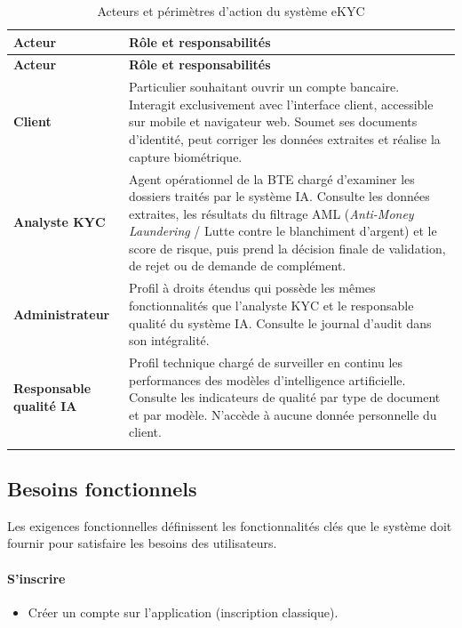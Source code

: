 \renewcommand{\arraystretch}{1.5}
\begin{longtable}{|>{\bfseries}p{3.8cm}|p{10.2cm}|}
  \hline
  \rowcolor{bleu_clair!20}
  \textbf{Acteur} & \textbf{Rôle et responsabilités} \\
  \hline
  \endfirsthead
  \hline
  \rowcolor{bleu_clair!20}
  \textbf{Acteur} & \textbf{Rôle et responsabilités} \\
  \hline
  \endhead
    Client & 
      Particulier souhaitant ouvrir un compte bancaire. Interagit exclusivement avec l'interface client, accessible sur mobile et navigateur web. Soumet ses documents d'identité, peut corriger les données extraites et réalise la capture biométrique. \\
    \hline
    Analyste KYC & 
      Agent opérationnel de la BTE chargé d'examiner les dossiers traités par le système IA. Consulte les données extraites, les résultats du filtrage AML (\textit{Anti-Money Laundering} / Lutte contre le blanchiment d'argent) et le score de risque, puis prend la décision finale de validation, de rejet ou de demande de complément. \\
    \hline
    Administrateur & 
      Profil à droits étendus qui possède les mêmes fonctionnalités que l'analyste KYC et le responsable qualité du système IA. Consulte le journal d'audit dans son intégralité. \\
    \hline
    Responsable qualité IA & 
      Profil technique chargé de surveiller en continu les performances des modèles d'intelligence artificielle. Consulte les indicateurs de qualité par type de document et par modèle. N'accède à aucune donnée personnelle du client. \\
    \hline
  
  \caption{Acteurs et périmètres d'action du système eKYC}
  \label{tab:acteurs_pfe}
\end{longtable}

\subsection{Besoins fonctionnels}
\label{subsec:besoins-fonctionnels}

Les exigences fonctionnelles définissent les fonctionnalités clés que le système doit fournir pour satisfaire les besoins des utilisateurs.

\paragraph*{S'inscrire}
\begin{itemize}
  \item Créer un compte sur l'application (inscription classique).
\end{itemize}
